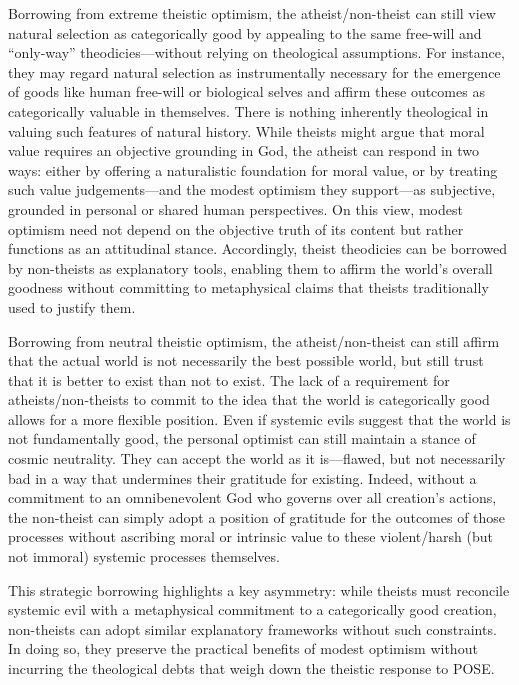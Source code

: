Borrowing from extreme theistic optimism, the atheist/non-theist can
still view natural selection as categorically good by appealing to the
same free-will and ``only-way'' theodicies---without relying on
theological assumptions. For instance, they may regard natural selection
as instrumentally necessary for the emergence of goods like human
free-will or biological selves and affirm these outcomes as
categorically valuable in themselves. There is nothing inherently
theological in valuing such features of natural history. While theists
might argue that moral value requires an objective grounding in God, the
atheist can respond in two ways: either by offering a naturalistic
foundation for moral value, or by treating such value judgements---and
the modest optimism they support---as subjective, grounded in personal
or shared human perspectives. On this view, modest optimism need not
depend on the objective truth of its content but rather functions as an
attitudinal stance. Accordingly, theist theodicies can be borrowed by
non-theists as explanatory tools, enabling them to affirm the world's
overall goodness without committing to metaphysical claims that theists
traditionally used to justify them.

Borrowing from neutral theistic optimism, the atheist/non-theist can
still affirm that the actual world is not necessarily the best possible
world, but still trust that it is better to exist than not to exist. The
lack of a requirement for atheists/non-theists to commit to the idea
that the world is categorically good allows for a more flexible
position. Even if systemic evils suggest that the world is not
fundamentally good, the personal optimist can still maintain a stance of
cosmic neutrality. They can accept the world as it is---flawed, but not
necessarily bad in a way that undermines their gratitude for existing.
Indeed, without a commitment to an omnibenevolent God who governs over
all creation's actions, the non-theist can simply adopt a position of
gratitude for the outcomes of those processes without ascribing moral or
intrinsic value to these violent/harsh (but not immoral) systemic
processes themselves.

This strategic borrowing highlights a key asymmetry: while theists must
reconcile systemic evil with a metaphysical commitment to a
categorically good creation, non-theists can adopt similar explanatory
frameworks without such constraints. In doing so, they preserve the
practical benefits of modest optimism without incurring the theological
debts that weigh down the theistic response to POSE.

